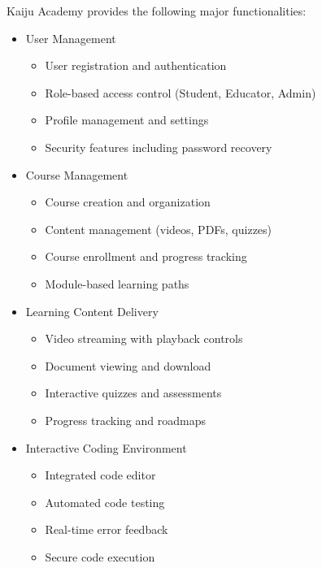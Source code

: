 \documentclass[a4paper, 11pt]{scrreprt}
\begin{document}
Kaiju Academy provides the following major functionalities:

\begin{itemize}
    \item User Management
        \begin{itemize}
            \item User registration and authentication
            \item Role-based access control (Student, Educator, Admin)
            \item Profile management and settings
            \item Security features including password recovery
        \end{itemize}
    
    \item Course Management
        \begin{itemize}
            \item Course creation and organization
            \item Content management (videos, PDFs, quizzes)
            \item Course enrollment and progress tracking
            \item Module-based learning paths
        \end{itemize}
    
    \item Learning Content Delivery
        \begin{itemize}
            \item Video streaming with playback controls
            \item Document viewing and download
            \item Interactive quizzes and assessments
            \item Progress tracking and roadmaps
        \end{itemize}
    
    \item Interactive Coding Environment
        \begin{itemize}
            \item Integrated code editor
            \item Automated code testing
            \item Real-time error feedback
            \item Secure code execution
        \end{itemize}
    

\end{itemize}
\end{document}
